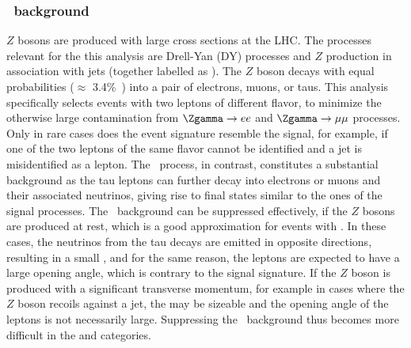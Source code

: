 \subsubsection{\Ztautau\ background}
$Z$ bosons are produced with large cross sections at the LHC. The processes relevant for the this analysis are Drell-Yan (DY) processes and $Z$ production in association with jets (together labelled as \Zgamma).
The $Z$ boson decays with equal probabilities ($\approx$ 3.4\%~\cite{PDG2020}) into a pair of electrons, muons, or taus. 
This analysis specifically selects events with two leptons of different flavor, to minimize the otherwise large contamination from $\Zgamma \to ee$ and $\Zgamma \to \mu\mu$ processes. Only in rare cases does the event signature resemble the signal, for example, if one of the two leptons of the same flavor cannot be identified and a jet is misidentified as a lepton.
The \Ztautau\ process, in contrast, constitutes a substantial background as the tau leptons can further decay into electrons or muons and their associated neutrinos, giving rise to final states similar to the ones of the signal processes. 
The \Ztautau\ background can be suppressed effectively, if the $Z$ bosons are produced at rest, which is a good approximation for events with \ZeroJet. In these cases, the neutrinos from the tau decays are emitted in opposite directions, resulting in a small \MET, and for the same reason, the leptons are expected to have a large opening angle, which is contrary to the signal signature. 
If the $Z$ boson is produced with a significant transverse momentum, for example in cases where the $Z$ boson recoils against a jet, the \MET may be sizeable and the opening angle of the leptons is not necessarily large. 
Suppressing the \Ztautau\ background thus becomes more difficult in the \OneJet and \TwoJet categories. 

